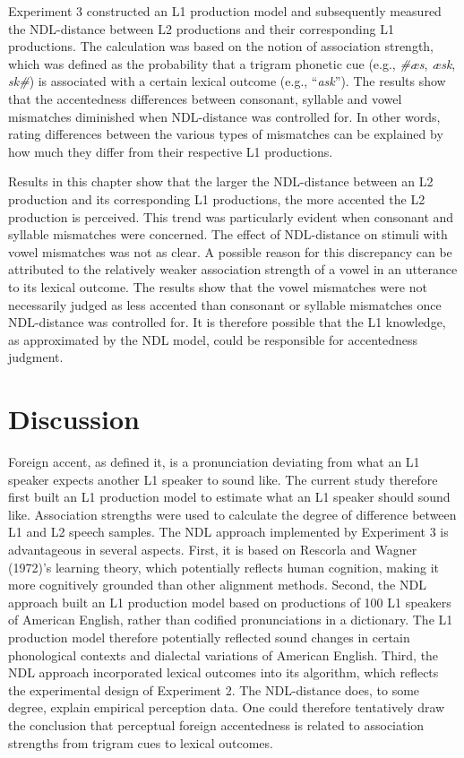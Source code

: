Experiment 3 constructed an L1 production model and subsequently measured the NDL-distance between L2 productions and their corresponding L1 productions. The calculation was based on the notion of association strength, which was defined as the probability that a trigram phonetic cue (e.g., \textit{\#æs}, \textit{æsk}, \textit{sk\#}) is associated with a certain lexical outcome (e.g., “\textit{ask}”). The results show that the accentedness differences between consonant, syllable and vowel mismatches diminished when NDL-distance was controlled for. In other words, rating differences between the various types of mismatches can be explained by how much they differ from their respective L1 productions.

Results in this chapter show that the larger the NDL-distance between an L2 production and its corresponding L1 productions, the more accented the L2 production is perceived. This trend was particularly evident when consonant and syllable mismatches were concerned. The effect of NDL-distance on stimuli with vowel mismatches was not as clear. A possible reason for this discrepancy can be attributed to the relatively weaker association strength of a vowel in an utterance to its lexical outcome. The results show that the vowel mismatches were not necessarily judged as less accented than consonant or syllable mismatches once NDL-distance was controlled for. It is therefore possible that the L1 knowledge, as approximated by the NDL model, could be responsible for accentedness judgment.


\section{Discussion}

Foreign accent, as \citet{Major_2012} defined it, is a pronunciation deviating from what an L1 speaker expects another L1 speaker to sound like. The current study therefore first built an L1 production model to estimate what an L1 speaker should sound like. Association strengths were used to calculate the degree of difference between L1 and L2 speech samples. The NDL approach implemented by Experiment 3 is advantageous in several aspects. First, it is based on Rescorla and Wagner (1972)’s learning theory, which potentially reflects human cognition, making it more cognitively grounded than other alignment methods. Second, the NDL approach built an L1 production model based on productions of 100 L1 speakers of American English, rather than codified pronunciations in a dictionary. The L1 production model therefore potentially reflected sound changes in certain phonological contexts and dialectal variations of American English. Third, the NDL approach incorporated lexical outcomes into its algorithm, which reflects the experimental design of Experiment 2. The NDL-distance does, to some degree, explain empirical perception data. One could therefore tentatively draw the conclusion that perceptual foreign accentedness is related to association strengths from trigram cues to lexical outcomes. 

